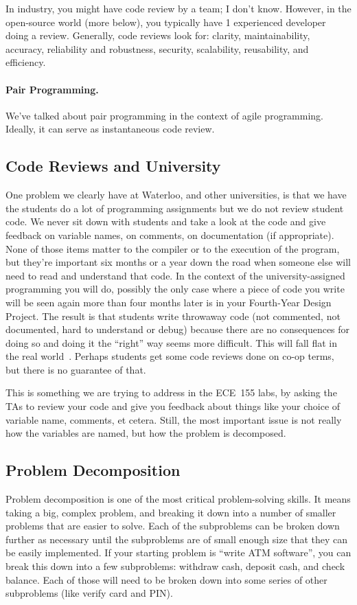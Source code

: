 In industry, you might have code review by a team; I don't
know. However, in the open-source world (more below), you typically
have 1 experienced developer doing a review. Generally, code reviews
look for: clarity, maintainability, accuracy, reliability and
robustness, security, scalability, reusability, and efficiency.

\paragraph{Pair Programming.} We've talked about pair programming in the 
context of agile programming. Ideally, it can serve as instantaneous code
review.

\subsection*{Code Reviews and University}
One problem we clearly have at Waterloo, and other universities, is that we have the students do a lot of programming assignments but we do not review student code. We never sit down with students and take a look at the code and give feedback on variable names, on comments, on documentation (if appropriate). None of those items matter to the compiler or to the execution of the program, but they're important six months or a year down the road when someone else will need to read and understand that code. In the context of the university-assigned programming you will do, possibly the only case where a piece of code you write will be seen again more than four months later is in your Fourth-Year Design Project. The result is that students write throwaway code (not commented, not documented, hard to understand or debug) because there are no consequences for doing so and doing it the ``right'' way seems more difficult. This will fall flat in the real world~\cite{pumps}. Perhaps students get some code reviews done on co-op terms, but there is no guarantee of that.

This is something we are trying to address in the ECE~155 labs, by asking the TAs to review your code and give you feedback about things like your choice of variable name, comments, et cetera. Still, the most important issue is not really how the variables are named, but how the problem is decomposed.

\subsection*{Problem Decomposition} Problem decomposition is one of the most critical problem-solving skills. It means taking a big, complex problem, and breaking it down into a number of smaller problems that are easier to solve. Each of the subproblems can be broken down further as necessary until the subproblems are of small enough size that they can be easily implemented.  If your starting problem is ``write ATM software'', you can break this down into a few subproblems: withdraw cash, deposit cash, and check balance. Each of those will need to be broken down into some series of other subproblems (like verify card and PIN). 

